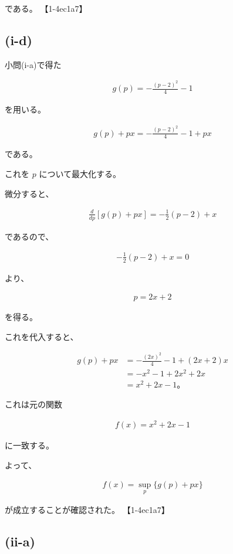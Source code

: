 \documentclass[platex,dvipdfmx,a4paper]{jsarticle}
\begin{document}
である。 【1-4ec1a7】

\subsection{(i-d)}

小問(i-a)で得た

\begin{align*}
g(p)
=
-\frac{(p-2)^2}{4}-1
\end{align*}

を用いる。

\begin{align*}
g(p)+px
=
-\frac{(p-2)^2}{4}-1+px
\end{align*}

である。

これを $p$ について最大化する。

微分すると、

\begin{align*}
\frac{d}{dp}
\left[g(p)+px\right]
=
-\frac12(p-2)+x
\end{align*}

であるので、

\begin{align*}
-\frac12(p-2)+x=0
\end{align*}

より、

\begin{align*}
p=2x+2
\end{align*}

を得る。

これを代入すると、

\begin{align*}
g(p)+px
&=
-\frac{(2x)^2}{4}-1
+(2x+2)x \\
&=
-x^2-1+2x^2+2x \\
&=
x^2+2x-1。
\end{align*}

これは元の関数

\begin{align*}
f(x)
=
x^2+2x-1
\end{align*}

に一致する。

よって、

\begin{align*}
f(x)
=
\sup_p
\{g(p)+px\}
\end{align*}

が成立することが確認された。 【1-4ec1a7】

\subsection{(ii-a)}
\end{document}
